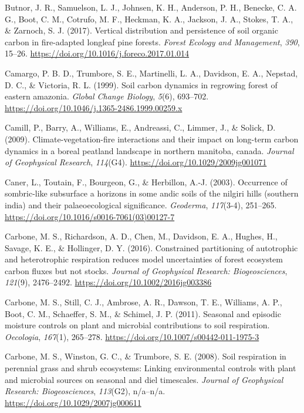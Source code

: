 \documentclass[]{article}
\begin{document}
\leavevmode\hypertarget{ref-Butnor_2017}{}%
Butnor, J. R., Samuelson, L. J., Johnsen, K. H., Anderson, P. H.,
Benecke, C. A. G., Boot, C. M., Cotrufo, M. F., Heckman, K. A., Jackson,
J. A., Stokes, T. A., \& Zarnoch, S. J. (2017). Vertical distribution
and persistence of soil organic carbon in fire-adapted longleaf pine
forests. \emph{Forest Ecology and Management}, \emph{390}, 15--26.
\url{https://doi.org/10.1016/j.foreco.2017.01.014}

\leavevmode\hypertarget{ref-De_Camargo_1999}{}%
Camargo, P. B. D., Trumbore, S. E., Martinelli, L. A., Davidson, E. A.,
Nepstad, D. C., \& Victoria, R. L. (1999). Soil carbon dynamics in
regrowing forest of eastern amazonia. \emph{Global Change Biology},
\emph{5}(6), 693--702.
\url{https://doi.org/10.1046/j.1365-2486.1999.00259.x}

\leavevmode\hypertarget{ref-Camill_2009}{}%
Camill, P., Barry, A., Williams, E., Andreassi, C., Limmer, J., \&
Solick, D. (2009). Climate-vegetation-fire interactions and their impact
on long-term carbon dynamics in a boreal peatland landscape in northern
manitoba, canada. \emph{Journal of Geophysical Research},
\emph{114}(G4). \url{https://doi.org/10.1029/2009jg001071}

\leavevmode\hypertarget{ref-Caner_2003}{}%
Caner, L., Toutain, F., Bourgeon, G., \& Herbillon, A.-J. (2003).
Occurrence of sombric-like subsurface a horizons in some andic soils of
the nilgiri hills (southern india) and their palaeoecological
significance. \emph{Geoderma}, \emph{117}(3-4), 251--265.
\url{https://doi.org/10.1016/s0016-7061(03)00127-7}

\leavevmode\hypertarget{ref-Carbone_2016}{}%
Carbone, M. S., Richardson, A. D., Chen, M., Davidson, E. A., Hughes,
H., Savage, K. E., \& Hollinger, D. Y. (2016). Constrained partitioning
of autotrophic and heterotrophic respiration reduces model uncertainties
of forest ecosystem carbon fluxes but not stocks. \emph{Journal of
Geophysical Research: Biogeosciences}, \emph{121}(9), 2476--2492.
\url{https://doi.org/10.1002/2016jg003386}

\leavevmode\hypertarget{ref-Carbone_2011}{}%
Carbone, M. S., Still, C. J., Ambrose, A. R., Dawson, T. E., Williams,
A. P., Boot, C. M., Schaeffer, S. M., \& Schimel, J. P. (2011). Seasonal
and episodic moisture controls on plant and microbial contributions to
soil respiration. \emph{Oecologia}, \emph{167}(1), 265--278.
\url{https://doi.org/10.1007/s00442-011-1975-3}

\leavevmode\hypertarget{ref-Carbone_2008}{}%
Carbone, M. S., Winston, G. C., \& Trumbore, S. E. (2008). Soil
respiration in perennial grass and shrub ecosystems: Linking
environmental controls with plant and microbial sources on seasonal and
diel timescales. \emph{Journal of Geophysical Research: Biogeosciences},
\emph{113}(G2), n/a--n/a. \url{https://doi.org/10.1029/2007jg000611}
\end{document}

